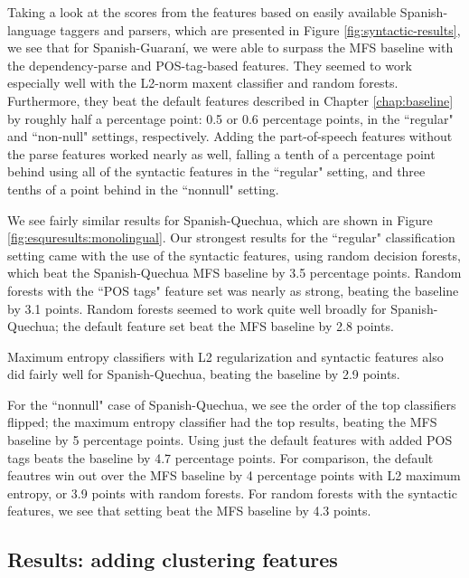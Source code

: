 Taking a look at the scores from the features based on easily available
Spanish-language taggers and parsers, which are presented in Figure
\ref{fig:syntactic-results}, we see that for Spanish-Guaraní, we were able to
surpass the MFS baseline with the dependency-parse and POS-tag-based features.
They seemed to work especially well with the L2-norm maxent classifier and
random forests. Furthermore, they beat the default features described in
Chapter \ref{chap:baseline} by roughly half a percentage point: 0.5 or 0.6
percentage points, in the ``regular" and ``non-null" settings, respectively.
Adding the part-of-speech features without the parse features worked nearly as
well, falling a tenth of a percentage point behind using all of the syntactic
features in the ``regular" setting, and three tenths of a point behind in the
``nonnull" setting.

We see fairly similar results for Spanish-Quechua, which are shown in Figure
\ref{fig:esquresults:monolingual}. Our strongest results for the ``regular"
classification setting came with the use of the syntactic features, using
random decision forests, which beat the Spanish-Quechua MFS baseline by 3.5
percentage points. Random forests with the ``POS tags" feature set was nearly
as strong, beating the baseline by 3.1 points. Random forests seemed to work
quite well broadly for Spanish-Quechua; the default feature set beat the
MFS baseline by 2.8 points.

Maximum entropy classifiers with L2 regularization and syntactic features also
did fairly well for Spanish-Quechua, beating the baseline by 2.9 points.

For the ``nonnull" case of Spanish-Quechua, we see the order of the top
classifiers flipped; the maximum entropy classifier had the top results,
beating the MFS baseline by 5 percentage points. Using just the default
features with added POS tags beats the baseline by 4.7 percentage points. For
comparison, the default feautres win out over the MFS baseline by 4 percentage
points with L2 maximum entropy, or 3.9 points with random forests. For random
forests with the syntactic features, we see that setting beat the MFS baseline
by 4.3 points.

\subsection{Results: adding clustering features}


